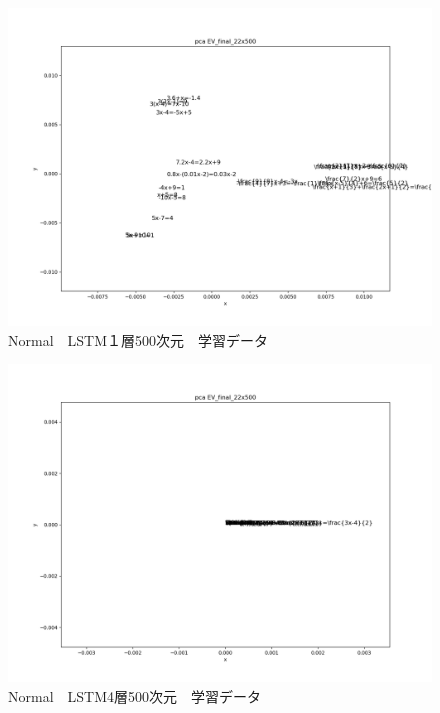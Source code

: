 \documentclass[a4j,11pt,report]{jsbook}
\begin{document}
\begin{center}
  \begin{figure}[tb]
    \centering
    \includegraphics[width=0.7\linewidth]{result/pca_formula_EV_final_22x500_1_Wed_Feb_06_06:28:21.png}
    \caption{Normal　LSTM１層500次元　学習データ}
    \label{fig:Simple1_500}
  \end{figure}
\end{center}


\begin{center}
  \begin{figure}[tb]
    \centering
    \includegraphics[width=0.7\linewidth]{result/pca_formula_EV_final_22x500_4_Wed_Feb_06_06:43:57.png}
    \caption{Normal　LSTM4層500次元　学習データ}
    \label{fig:Simple4_500}
  \end{figure}
\end{center}
\end{document}

